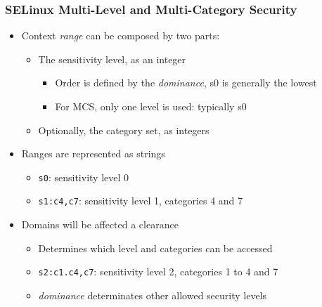 \begin{frame}
	\frametitle{SELinux Multi-Level and Multi-Category Security}
	\begin{itemize}
		\item Context \emph{range} can be composed by two parts:
			\begin{itemize}
				\item The sensitivity level, as an integer
					\begin{itemize}
						\item Order is defined by the \emph{dominance}, s0 is generally the
							lowest
						\item For MCS, only one level is used: typically s0
					\end{itemize}
				\item Optionally, the category set, as integers
			\end{itemize}
		\item Ranges are represented as strings
			\begin{itemize}
				\item \texttt{s0}: sensitivity level 0
				\item \texttt{s1:c4,c7}: sensitivity level 1, categories 4 and 7
			\end{itemize}
		\item Domains will be affected a clearance
			\begin{itemize}
				\item Determines which level and categories can be accessed
				\item \texttt{s2:c1.c4,c7}: sensitivity level 2, categories 1 to 4 and 7
				\item \emph{dominance} determinates other allowed security levels
			\end{itemize}
	\end{itemize}
\end{frame}

